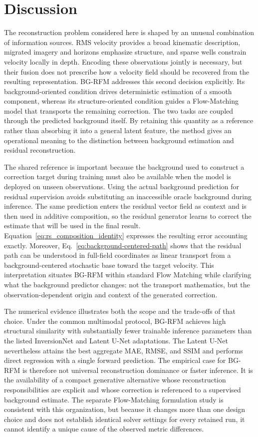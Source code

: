 \section{Discussion}

The reconstruction problem considered here is shaped by an unusual combination of information sources. RMS velocity provides a broad kinematic description, migrated imagery and horizons emphasize structure, and sparse wells constrain velocity locally in depth. Encoding these observations jointly is necessary, but their fusion does not prescribe how a velocity field should be recovered from the resulting representation. BG-RFM addresses this second decision explicitly. Its background-oriented condition drives deterministic estimation of a smooth component, whereas its structure-oriented condition guides a Flow-Matching model that transports the remaining correction. The two tasks are coupled through the predicted background itself. By retaining this quantity as a reference rather than absorbing it into a general latent feature, the method gives an operational meaning to the distinction between background estimation and residual reconstruction.

The shared reference is important because the background used to construct a correction target during training must also be available when the model is deployed on unseen observations. Using the actual background prediction for residual supervision avoids substituting an inaccessible oracle background during inference. The same prediction enters the residual vector field as context and is then used in additive composition, so the residual generator learns to correct the estimate that will be used in the final result. Equation~\eqref{eq:rs_composition_identity} expresses the resulting error accounting exactly. Moreover, Eq.~\eqref{eq:background-centered-path} shows that the residual path can be understood in full-field coordinates as linear transport from a background-centered stochastic base toward the target velocity. This interpretation situates BG-RFM within standard Flow Matching while clarifying what the background predictor changes: not the transport mathematics, but the observation-dependent origin and context of the generated correction.

The numerical evidence illustrates both the scope and the trade-offs of that choice. Under the common multimodal protocol, BG-RFM achieves high structural similarity with substantially fewer trainable inference parameters than the listed InversionNet and Latent U-Net adaptations. The Latent U-Net nevertheless attains the best aggregate MAE, RMSE, and SSIM and performs direct regression with a single forward prediction. The empirical case for BG-RFM is therefore not universal reconstruction dominance or faster inference. It is the availability of a compact generative alternative whose reconstruction responsibilities are explicit and whose correction is referenced to a supervised background estimate. The separate Flow-Matching formulation study is consistent with this organization, but because it changes more than one design choice and does not establish identical solver settings for every retained run, it cannot identify a unique cause of the observed metric differences.

